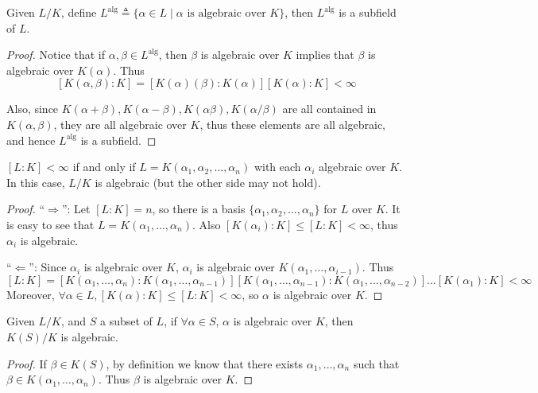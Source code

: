 \begin{prop} \label{prop:alg-elements-form-a-field}
  Given $L/K$, define $L^{\text{alg}} \triangleq \{ \alpha \in L \mid \alpha \text{ is algebraic over } K \}$,
  then $L^{\text{alg}}$ is a subfield of $L$.

  \begin{proof}
    Notice that if $\alpha, \beta \in L^{\text{alg}}$, then $\beta$ is algebraic over $K$
    implies that $\beta$ is algebraic over $K(\alpha)$. Thus
    \[ [K(\alpha, \beta): K] = [K(\alpha)(\beta): K(\alpha)] [K(\alpha): K]
      < \infty \]

    Also, since $K(\alpha + \beta), K(\alpha - \beta), K(\alpha \beta), K(\alpha / \beta)$ are
    all contained in $K(\alpha, \beta)$, they are all algebraic over $K$, thus
    these elements are all algebraic, and hence $L^{\text{alg}}$ is a subfield.
  \end{proof}
\end{prop}

\begin{prop}
  $[L: K] < \infty$ if and only if $L = K(\alpha_1, \alpha_2, \dots, \alpha_n)$ with each $\alpha_i$
  algebraic over $K$. In this case, $L / K$ is algebraic (but the other side may not hold).

  \begin{proof}
    ``$\Rightarrow$'': Let $[L: K] = n$, so there is a basis $\{ \alpha_1, \alpha_2, \dots, \alpha_n \}$
    for $L$ over $K$. It is easy to see that $L = K(\alpha_1, \dots, \alpha_n)$.
    Also $[K(\alpha_i): K] \leq [L: K] < \infty$, thus $\alpha_i$ is algebraic.

    ``$\Leftarrow$'': Since $\alpha_i$ is algebraic over $K$, $\alpha_i$ is algebraic over $K(\alpha_1, \dots, \alpha_{i-1})$.
    Thus
    \[ [L: K] = [K(\alpha_1, \dots, \alpha_n): K(\alpha_1, \dots, \alpha_{n-1})]
      [K(\alpha_1, \dots, \alpha_{n-1}): K(\alpha_1, \dots, \alpha_{n-2})] \dots [K(\alpha_1): K] < \infty \]
    Moreover, $\forall \alpha \in L, [K(\alpha): K] \leq [L: K] < \infty$, so $\alpha$ is algebraic over $K$.
  \end{proof}
\end{prop}

\begin{coro}
  Given $L/K$, and $S$ a subset of $L$, if $\forall \alpha \in S$, $\alpha$ is
  algebraic over $K$, then $K(S) / K$ is algebraic.

  \begin{proof}
    If $\beta \in K(S)$, by definition we know that there exists
    $\alpha_1, \dots, \alpha_n$ such that $\beta \in K(\alpha_1, \dots, \alpha_n)$.
    Thus $\beta$ is algebraic over $K$.
  \end{proof}
\end{coro}

